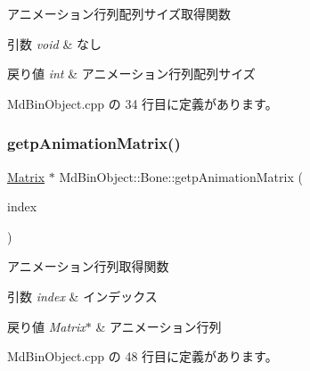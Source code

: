 アニメーション行列配列サイズ取得関数 


\begin{DoxyParams}{引数}
{\em void} & なし \\
\hline
\end{DoxyParams}

\begin{DoxyRetVals}{戻り値}
{\em int} & アニメーション行列配列サイズ \\
\hline
\end{DoxyRetVals}


 Md\+Bin\+Object.\+cpp の 34 行目に定義があります。

\mbox{\label{class_md_bin_object_1_1_bone_a1fbda2e276ea0036c0f86145ae7dbd08}} 
\subsubsection{\texorpdfstring{getp\+Animation\+Matrix()}{getpAnimationMatrix()}}
{\footnotesize\ttfamily \mbox{\hyperlink{class_matrix}{Matrix}} $\ast$ Md\+Bin\+Object\+::\+Bone\+::getp\+Animation\+Matrix (\begin{DoxyParamCaption}\item[{int}]{index }\end{DoxyParamCaption})}



アニメーション行列取得関数 


\begin{DoxyParams}{引数}
{\em index} & インデックス \\
\hline
\end{DoxyParams}

\begin{DoxyRetVals}{戻り値}
{\em Matrix$\ast$} & アニメーション行列 \\
\hline
\end{DoxyRetVals}


 Md\+Bin\+Object.\+cpp の 48 行目に定義があります。

\mbox{\label{class_md_bin_object_1_1_bone_a253478f63c13730809e943a3928b7e50}} 
